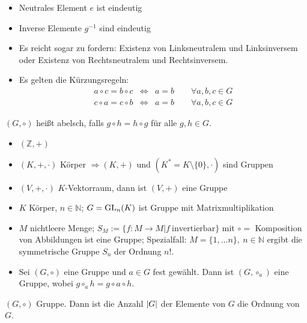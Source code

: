 \documentclass[12pt,a4paper]{scrartcl}
\begin{document}
\begin{bem}
\leavevmode
\begin{itemize}
	\item Neutrales Element $e$ ist eindeutig
	\item Inverse Elemente $g^{-1}$ sind eindeutig
	\item Es reicht sogar zu fordern: Existenz von Linksneutralem und Linksinversem oder Existenz von Rechtsneutralem und Rechtsinversem.
	\item Es gelten die Kürzungsregeln:
		\begin{eqnarray*}
			a\circ c = b\circ c &\Leftrightarrow& a = b\qquad \forall a,b,c\in G\\
			c\circ a = c\circ b &\Leftrightarrow& a = b \qquad \forall a,b,c\in G
		\end{eqnarray*}
\end{itemize}
\end{bem}

\begin{defi}
	$(G,\circ)$ heißt abelsch, falls $g\circ h = h\circ g$ für alle $g,h\in G$.
\end{defi}

\begin{bsp}
\leavevmode
\begin{itemize}
	\item $(\mathbb Z, +)$
	\item $(K,+,\cdot)$ Körper $\Rightarrow (K,+)$ und $(K^*=K\setminus \{0\}, \cdot)$ sind Gruppen
	\item $(V,+,\cdot)$ $K$-Vektorraum, dann ist $(V,+)$ eine Gruppe
	\item $K$ Körper, $n\in\mathbb N$; $G = \operatorname{GL}_n(K)$ ist Gruppe mit Matrixmultiplikation
	\item $M$ nichtleere Menge; $S_M := \{f\colon M\to M|f ~ \text{invertierbar}\}$ mit $\circ = $ Komposition von Abbildungen ist eine Gruppe; Spezialfall: $M = \{1,\dots n\},\ n\in\mathbb N$ ergibt die symmetrische Gruppe $S_n$ der Ordnung $n!$.
	\item Sei $(G,\circ)$ eine Gruppe und $a\in G$ fest gewählt. Dann ist $(G,\circ_a)$ eine Gruppe, wobei $g\circ_a h = g\circ a\circ h$.
\end{itemize}
\end{bsp}

\begin{defi} 
	$(G,\circ)$ Gruppe. Dann ist die Anzahl $\lvert G\rvert$ der Elemente von $G$ die Ordnung von $G$.
\end{defi}
\end{document}
